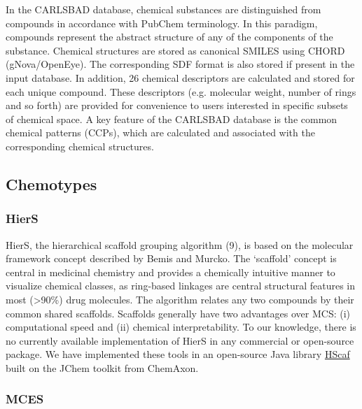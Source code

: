 In the CARLSBAD database, chemical substances are distinguished from compounds in accordance with PubChem terminology. In this paradigm, compounds represent the abstract structure of any of the components of the substance. Chemical structures are stored as canonical SMILES using CHORD (gNova/OpenEye). The corresponding SDF format is also stored if present in the input database. In addition, 26 chemical descriptors are calculated and stored for each unique compound. These descriptors (e.g. molecular weight, number of rings and so forth) are provided for convenience to users interested in specific subsets of chemical space. A key feature of the CARLSBAD database is the common chemical patterns (CCPs), which are calculated and associated with the corresponding chemical structures.

\subsection{Chemotypes}

\subsubsection{HierS}

HierS, the hierarchical scaffold grouping algorithm\cite{Wilkens2005-ja} (9), is based on the molecular framework concept described by Bemis and Murcko\cite{Bemis1996-jg}. The ‘scaffold’ concept is central in medicinal chemistry and provides a chemically intuitive manner to visualize chemical classes, as ring-based linkages are central structural features in most (\textgreater 90\%) drug molecules. The algorithm relates any two compounds by their common shared scaffolds. Scaffolds generally have two advantages over MCS: (i) computational speed and (ii) chemical interpretability. To our knowledge, there is no currently available implementation of HierS in any commercial or open-source package. We have implemented these tools in an open-source Java library \href{https://github.com/unmtransinfo/unm_biocomp_hscaf}{HScaf}\cite{Yang2012-qd} built on the JChem toolkit from ChemAxon.

\subsubsection{MCES}

